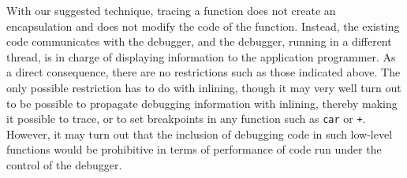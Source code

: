 With our suggested technique, tracing a function does not create an
encapsulation and does not modify the code of the function.  Instead,
the existing code communicates with the debugger, and the debugger,
running in a different thread, is in charge of displaying information
to the application programmer.  As a direct consequence, there are no
restrictions such as those indicated above.  The only possible
restriction has to do with inlining, though it may very well turn out
to be possible to propagate debugging information with inlining,
thereby making it possible to trace, or to set breakpoints in any
function such as \texttt{car} or \texttt{+}.  However, it may turn out
that the inclusion of debugging code in such low-level functions would be
prohibitive in terms of performance of code run under the control of
the debugger.
